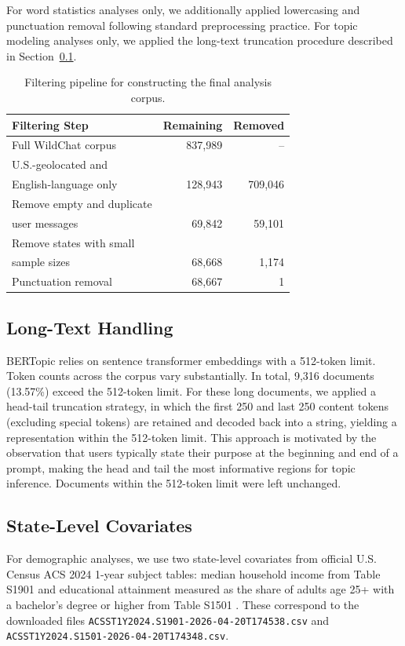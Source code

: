 \documentclass[11pt]{article}
\begin{document}
For word statistics analyses only, we additionally applied lowercasing and punctuation removal following standard preprocessing practice. For topic modeling analyses only, we applied the long-text truncation procedure described in Section~\ref{subsec:long-text-handling}.

\begin{table}[t]
  \centering
  \small
  \begin{tabular}{lrr}
    \toprule
    \textbf{Filtering Step} & \textbf{Remaining} & \textbf{Removed} \\
    \midrule
    Full WildChat corpus & 837,989 & -- \\
    U.S.-geolocated and\\
    English-language only & 128,943 & 709,046 \\
    Remove empty and duplicate\\
    user messages& 69,842 & 59,101 \\
    Remove states with small\\
    sample sizes& 68,668 & 1,174 \\
    Punctuation removal & 68,667 & 1 \\
    \bottomrule
  \end{tabular}
  \caption{Filtering pipeline for constructing the final analysis corpus.}
  \label{tab:filtering}
\end{table}

\subsection{Long-Text Handling}
\label{subsec:long-text-handling}
BERTopic relies on sentence transformer embeddings with a 512-token limit. Token counts across the corpus vary substantially. In total, 9,316 documents (13.57\%) exceed the 512-token limit.
For these long documents, we applied a head-tail truncation strategy, in which the first 250 and last 250 content tokens (excluding special tokens) are retained and decoded back into a string, yielding a representation within the 512-token limit. This approach is motivated by the observation that users typically state their purpose at the beginning and end of a prompt, making the head and tail the most informative regions for topic inference. Documents within the 512-token limit were left unchanged.

\subsection{State-Level Covariates}
For demographic analyses, we use two state-level covariates from official U.S. Census ACS 2024 1-year subject tables: median household income from Table S1901 \citep{uscensus_acs2024_s1901} and educational attainment measured as the share of adults age 25+ with a bachelor's degree or higher from Table S1501 \citep{uscensus_acs2024_s1501}. These correspond to the downloaded files \texttt{ACSST1Y2024.S1901-2026-04-20T174538.csv} and \texttt{ACSST1Y2024.S1501-2026-04-20T174348.csv}.
\end{document}
